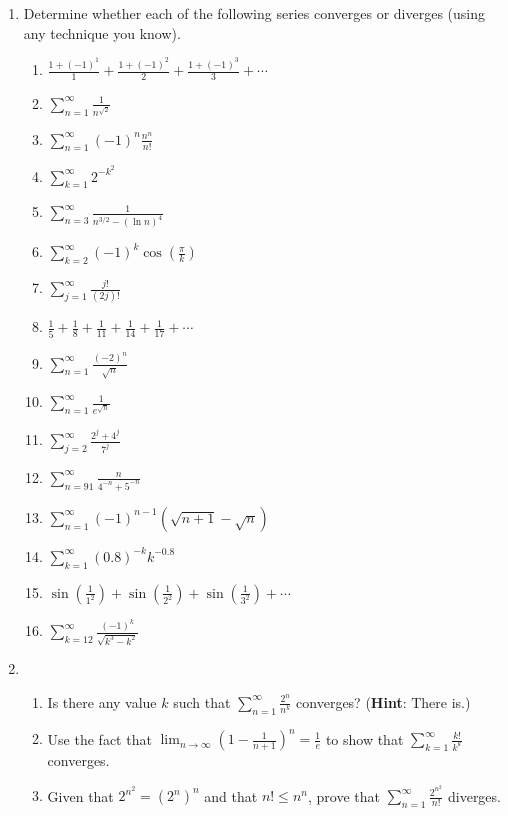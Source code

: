 \documentclass[12 pt]{article}
\newcommand{\hint}[1]{(\textbf{Hint}: #1)}
\newcommand{\infsum}[3]{\sum_{{#1}={#2}}^\infty {#3}}
\begin{document}
\begin{enumerate}[leftmargin=0in, rightmargin=-0.25in]
	\newpage
	\item Determine whether each of the following series converges or diverges (using any technique you know).
	\begin{multicols}{2}
		\begin{enumerate}[itemsep=0.25in]
			\item $\frac{1+(-1)^1}{1}+\frac{1+(-1)^2}{2}+\frac{1+(-1)^3}{3}+\cdots$
			\item $\sum_{n=1}^\infty \frac{1}{n^{\sqrt{2}}}$
			\item $\infsum{n}{1}{(-1)^n\frac{n^n}{n!}}$
			\item $\sum_{k=1}^\infty 2^{-k^2}$
			\item $\infsum{n}{3}{\frac{1}{n^{3/2}-(\ln{n})^4}}$
			\item $\infsum{k}{2}{(-1)^k\cos\left(\frac{\pi}{k}\right)}$
			\item $\infsum{j}{1}{\frac{j!}{(2j)!}}$
			\item $\frac{1}{5}+\frac{1}{8}+\frac{1}{11}+\frac{1}{14}+\frac{1}{17}+\cdots$
			\item $\infsum{n}{1}{\frac{(-2)^n}{\sqrt{n}}}$
			\item $\infsum{n}{1}{\frac{1}{e^{\sqrt{n}}}}$
			\item $\infsum{j}{2}{\frac{2^j+4^j}{7^j}}$
			\item $\infsum{n}{91}{\frac{n}{4^{-n}+5^{-n}}}$
			\item $\infsum{n}{1}{(-1)^{n-1}\left(\sqrt{n+1}-\sqrt{n}\right)}$
			\item $\infsum{k}{1}{(0.8)^{-k}k^{-0.8}}$
			\item $\sin\left(\frac{1}{1^2}\right)+\sin\left(\frac{1}{2^2}\right)+\sin\left(\frac{1}{3^2}\right)+\cdots$
			\item $\infsum{k}{12}{\frac{(-1)^k}{\sqrt{k^3-k^2}}}$
		\end{enumerate}
	\end{multicols}
	\vspace{0.125in}
	
	\item \begin{enumerate}
		\item Is there any value $k$ such that $\infsum{n}{1}{\frac{2^n}{n^k}}$ converges? \hint{There is.}
		\item Use the fact that $\lim_{n\to\infty}\left(1-\frac{1}{n+1}\right)^n=\frac{1}{e}$ to show that $\infsum{k}{1}{\frac{k!}{k^k}}$ converges.
		\item Given that $2^{n^2}=(2^n)^n$ and that $n!\leq n^n$, prove that $\infsum{n}{1}{\frac{2^{n^2}}{n!}}$ diverges.
	\end{enumerate}
\end{enumerate}
\end{document}

